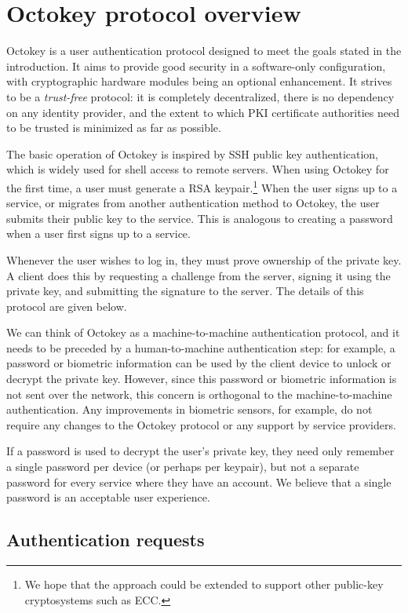 \section{Octokey protocol overview}

Octokey is a user authentication protocol designed to meet the goals stated in the introduction. It
aims to provide good security in a software-only configuration, with cryptographic hardware modules
being an optional enhancement. It strives to be a \emph{trust-free} protocol: it is completely
decentralized, there is no dependency on any identity provider, and the extent to which PKI
certificate authorities need to be trusted is minimized as far as possible.

The basic operation of Octokey is inspired by SSH public key authentication, which is widely used
for shell access to remote servers. When using Octokey for the first time, a user must generate a
RSA keypair.\footnote{We hope that the approach could be extended to support other public-key
cryptosystems such as ECC.} When the user signs up to a service, or migrates from another
authentication method to Octokey, the user submits their public key to the service. This is
analogous to creating a password when a user first signs up to a service.

Whenever the user wishes to log in, they must prove ownership of the private key. A client does this
by requesting a challenge from the server, signing it using the private key, and submitting the
signature to the server. The details of this protocol are given below.

We can think of Octokey as a machine-to-machine authentication protocol, and it needs to be preceded
by a human-to-machine authentication step: for example, a password or biometric information can be
used by the client device to unlock or decrypt the private key. However, since this password or
biometric information is not sent over the network, this concern is orthogonal to the
machine-to-machine authentication. Any improvements in biometric sensors, for example, do not
require any changes to the Octokey protocol or any support by service providers.

If a password is used to decrypt the user's private key, they need only remember a single password
per device (or perhaps per keypair), but not a separate password for every service where they have
an account. We believe that a single password is an acceptable user experience.

\subsection{Authentication requests}


